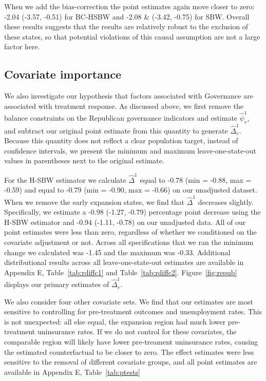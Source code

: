 When we add the bias-correction the point estimates again move closer to zero: -2.04 (-3.57, -0.51) for BC-HSBW and -2.08 & (-3.42, -0.75) for SBW. Overall these results suggests that the results are relatively robust to the exclusion of these states, so that potential violations of this causal assumption are not a large factor here.

\subsection{Covariate importance}

We also investigate our hypothesis that factors associated with Governance are associated with treatment response. As discussed above, we first remove the balance constraints on the Republican governance indicators and estimate $\hat{\psi}^1_v$, and subtract our original point estimate from this quantity to generate $\hat{\Delta}_v^1$. Because this quantity does not reflect a clear population target, instead of confidence intervals, we present the minimum and maximum leave-one-state-out values in parentheses next to the original estimate.

For the H-SBW estimator we calculate $\hat{\Delta}^1$ equal to -0.78 (min = -0.88, max = -0.59) and equal to -0.79 (min = -0.90, max = -0.66) on our unadjusted dataset. When we remove the early expansion states, we find that $\hat{\Delta}^1$ decreases slightly. Specifically, we estimate a -0.98 (-1.27, -0.79) percentage point decrease using the H-SBW estimator and -0.94 (-1.11, -0.78) on our unadjusted data. All of our point estimates were less than zero, regardless of whether we conditioned on the covariate adjustment or not. Across all specifications that we ran the minimum change we calculated was -1.45 and the maximum was -0.33. Additional distributional results across all leave-one-state-out estimates are available in Appendix E, Table~\ref{tab:rdiffc1} and Table~\ref{tab:rdiffc2}. Figure~\ref{fig:repub} displays our primary estimates of $\hat{\Delta}_v^1$. 

We also consider four other covariate sets. We find that our estimates are most sensitive to controlling for pre-treatment outcomes and unemployment rates. This is not unexpected: all else equal, the expansion region had much lower pre-treatment uninsurance rates. If we do not control for these covariates, the comparable region will likely have lower pre-treament uninsurance rates, causing the estimated counterfactual to be closer to zero. The effect estimates were less sensitive to the removal of different covariate groups, and all point estimates are available in Appendix E, Table~\ref{tab:ptests}

